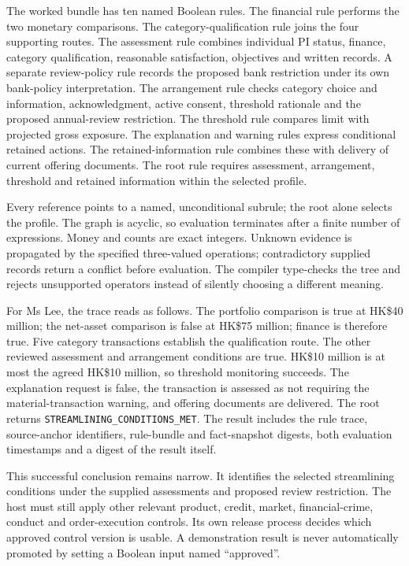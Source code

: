 \documentclass[12pt,a4paper,oneside,openany]{book}
\begin{document}
The worked bundle has ten named Boolean rules. The financial rule performs the
two monetary comparisons. The category-qualification rule joins the four
supporting routes. The assessment rule combines individual PI status, finance,
category qualification, reasonable satisfaction, objectives and written records.
A separate review-policy rule records the proposed bank restriction under its
own bank-policy interpretation. The arrangement rule checks category choice and information, acknowledgment,
active consent, threshold rationale and the proposed annual-review restriction.
The threshold rule compares limit with projected gross exposure. The explanation
and warning rules express conditional retained actions. The retained-information
rule combines these with delivery of current offering documents. The root rule
requires assessment, arrangement, threshold and retained information within the
selected profile.

Every reference points to a named, unconditional subrule; the root alone selects
the profile. The graph is acyclic, so evaluation terminates after a finite number
of expressions. Money and counts are exact integers. Unknown evidence is
propagated by the specified three-valued operations; contradictory supplied
records return a conflict before evaluation. The compiler type-checks the tree
and rejects unsupported operators instead of silently choosing a different
meaning.

For Ms Lee, the trace reads as follows. The portfolio comparison is true at
HK\$40 million; the net-asset comparison is false at HK\$75 million; finance
is therefore true. Five category transactions establish the qualification route.
The other reviewed assessment and arrangement conditions are true. HK\$10
million is at most the agreed HK\$10 million, so threshold monitoring succeeds.
The explanation request is false, the transaction is assessed as not requiring
the material-transaction warning, and offering documents are delivered. The root
returns \texttt{STREAMLINING\_CONDITIONS\_MET}. The result includes the rule
trace, source-anchor identifiers, rule-bundle and fact-snapshot digests, both
evaluation timestamps and a digest of the result itself.

This successful conclusion remains narrow. It identifies the selected
streamlining conditions under the supplied assessments and proposed review
restriction. The host must still apply other relevant product, credit, market,
financial-crime, conduct and order-execution controls. Its own release process
decides which approved control version is usable. A demonstration result is
never automatically promoted by setting a Boolean input named ``approved''.
\end{document}
